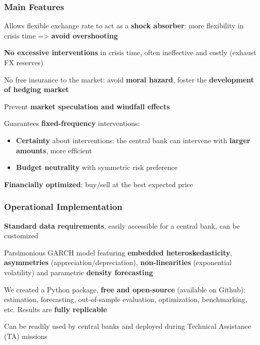 \documentclass{beamer}
\newenvironment{wideitemize}{\itemize\addtolength{\itemsep}{10pt}}{\enditemize}
\newenvironment{wideenumerate}{\enumerate\addtolength{\itemsep}{10pt}}{\endenumerate}
\begin{document}
\begin{frame}
    \frametitle{Main Features}
  \begin{wideenumerate}
  \item Allows flexible exchange rate to act as a \textbf{shock absorber}:
    more flexibility in crisis time => \textbf{avoid overshooting}
  \item \textbf{No excessive interventions} in crisis time, often ineffective
    and costly (exhaust FX reserves)
  \item No free insurance to the market: avoid \textbf{moral
      hazard}, foster the \textbf{development of hedging market}
  \item Prevent \textbf{market speculation and windfall effects}
  \item Guarantees \textbf{fixed-frequency} interventions: 
    \begin{itemize}
    \item \textbf{Certainty} about interventions: the central bank can intervene with
      \textbf{larger amounts}, more efficient
    \item \textbf{Budget neutrality} with symmetric risk preference
    \end{itemize}
  \item \textbf{Financially optimized}: buy/sell at the best expected price
  \end{wideenumerate}  
\end{frame}


\begin{frame}
  \frametitle{Operational Implementation}
  \begin{wideitemize}
  \item \textbf{Standard data requirements}, easily accessible for a central
    bank, can be customized
  \item Parsimonious GARCH model featuring \textbf{embedded heteroskedasticity},  \textbf{asymmetries}
    (appreciation/depreciation), \textbf{non-linearities} (exponential
    volatility) and parametric \textbf{density forecasting}    
  \item We created a Python package, \textbf{free and open-source}  (available on Github): estimation, forecasting,
    out-of-sample evaluation, optimization, benchmarking, etc. Results are \textbf{fully replicable}
  \item Can be readily used by central banks and deployed during Technical Assistance (TA) missions
  \end{wideitemize}
\end{frame}
\end{document}
